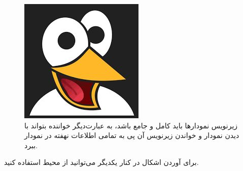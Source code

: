 \documentclass{CSICC2020}
\begin{document}
\begin{figure}
\includegraphics[width=.9\linewidth]{Images/blank}
\caption{
زیرنویس نمودارها باید کامل و جامع باشد، به عبارت‌دیگر خواننده بتواند با دیدن نمودار و خواندن زیرنویس آن پی به تمامی اطلاعات نهفته در نمودار ببرد.}
\label{fig:sumXYPlot}
\end{figure}
برای آوردن اشکال در کنار یکدیگر می‌توانید از محیط  استفاده کنید. 
\end{document}
